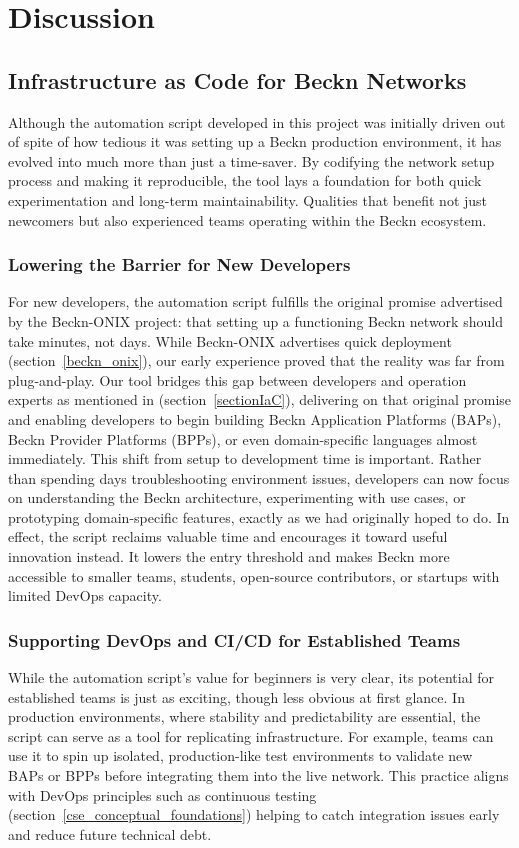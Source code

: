 \section{Discussion}
\label{discussion}
\subsection{Infrastructure as Code for Beckn Networks}
\label{IaC_discussion}
Although the automation script developed in this project was initially driven out of spite of how tedious it was setting up a Beckn production environment, it has evolved into much more than just a time-saver. By codifying the network setup process and making it reproducible, the tool lays a foundation for both quick experimentation and long-term maintainability. Qualities that benefit not just newcomers but also experienced teams operating within the Beckn ecosystem.

\subsubsection{Lowering the Barrier for New Developers}
For new developers, the automation script fulfills the original promise advertised by the Beckn-ONIX project: that setting up a functioning Beckn network should take minutes, not days. While Beckn-ONIX advertises quick deployment (section~\ref{beckn_onix}), our early experience proved that the reality was far from plug-and-play. Our tool bridges this gap between developers and operation experts as mentioned in (section~\ref{sectionIaC}), delivering on that original promise and enabling developers to begin building Beckn Application Platforms (BAPs), Beckn Provider Platforms (BPPs), or even domain-specific languages almost immediately.
This shift from setup to development time is important. Rather than spending days troubleshooting environment issues, developers can now focus on understanding the Beckn architecture, experimenting with use cases, or prototyping domain-specific features, exactly as we had originally hoped to do. In effect, the script reclaims valuable time and encourages it toward useful innovation instead. It lowers the entry threshold and makes Beckn more accessible to smaller teams, students, open-source contributors, or startups with limited DevOps capacity.

\subsubsection{Supporting DevOps and CI/CD for Established Teams}
While the automation script’s value for beginners is very clear, its potential for established teams is just as exciting, though less obvious at first glance. In production environments, where stability and predictability are essential, the script can serve as a tool for replicating infrastructure. For example, teams can use it to spin up isolated, production-like test environments to validate new BAPs or BPPs before integrating them into the live network. This practice aligns with DevOps principles such as continuous testing (section~\ref{cse_conceptual_foundations}) helping to catch integration issues early and reduce future technical debt.

